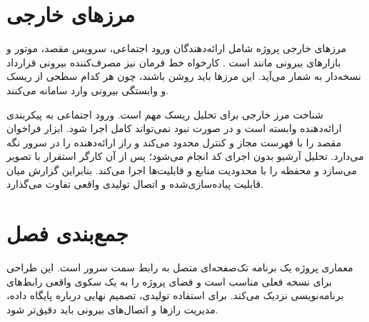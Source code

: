 \section{مرزهای خارجی}
مرزهای خارجی پروژه شامل ارائه‌دهندگان ورود اجتماعی، سرویس مقصد، موتور  و بازارهای بیرونی مانند  است \cite{rapidapi}. کارخواه خط فرمان نیز مصرف‌کننده بیرونی قرارداد نسخه‌دار به شمار می‌آید. این مرزها باید روشن باشند، چون هر کدام سطحی از ریسک و وابستگی بیرونی وارد سامانه می‌کنند.

شناخت مرز خارجی برای تحلیل ریسک مهم است. ورود اجتماعی به پیکربندی ارائه‌دهنده وابسته است و در صورت نبود  نمی‌تواند کامل اجرا شود. ابزار فراخوان مقصد را با فهرست مجاز و کنترل  محدود می‌کند و راز ارائه‌دهنده را در سرور نگه می‌دارد. تحلیل آرشیو بدون اجرای کد انجام می‌شود؛ پس از آن کارگر استقرار با  تصویر می‌سازد و محفظه را با محدودیت منابع و قابلیت‌ها اجرا می‌کند. بنابراین گزارش میان قابلیت پیاده‌سازی‌شده و اتصال تولیدی واقعی تفاوت می‌گذارد.

\section{جمع‌بندی فصل}
معماری پروژه یک برنامه تک‌صفحه‌ای متصل به رابط سمت سرور است. این طراحی برای نسخه فعلی مناسب است و فضای پروژه را به یک سکوی واقعی رابط‌های برنامه‌نویسی نزدیک می‌کند. برای استفاده تولیدی، تصمیم نهایی درباره پایگاه داده، مدیریت رازها و اتصال‌های بیرونی باید دقیق‌تر شود.
